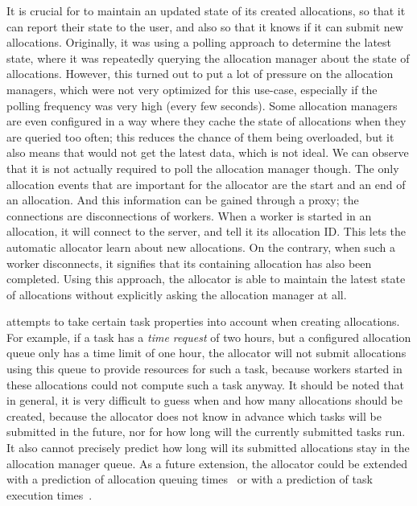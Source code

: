 It is crucial for \autoalloc{} to maintain an updated state of its created allocations, so that it can report their state
to the user, and also so that it knows if it can submit new allocations. Originally, it was using a polling approach to determine
the latest state, where it was repeatedly querying the allocation manager about the state of allocations. However, this
turned out to put a lot of pressure on the allocation managers, which were not very optimized for this use-case, especially
if the polling frequency was very high (every few seconds). Some allocation managers are even configured in a way where
they cache the state of allocations when they are queried too often; this reduces the chance of them being overloaded, but
it also means that \hyperqueue{} would not get the latest data, which is not ideal. We can observe that it is not actually
required to poll the allocation manager though. The only allocation events that are important for the allocator are
the start and an end of an allocation. And this information can be gained through a proxy; the connections are disconnections
of \hq{} workers. When a worker is started in an allocation, it will connect to the server, and tell it its allocation ID.
This lets the automatic allocator learn about new allocations. On the contrary, when such a worker disconnects, it signifies
that its containing allocation has also been completed. Using this approach, the allocator is able to maintain the latest
state of allocations without explicitly asking the allocation manager at all.

\Autoalloc{} attempts to take certain task properties into account when creating allocations. For example, if a task
has a \emph{time request} of two hours, but a configured allocation queue only has a time limit of one hour, the allocator
will not submit allocations using this queue to provide resources for such a task, because workers started in these allocations
could not compute such a task anyway. It should be noted that in general, it is very difficult to guess when and how many
allocations should be created, because the allocator does not know in advance which tasks will be submitted in the future,
nor for how long will the currently submitted tasks run. It also cannot precisely predict how long will its submitted allocations
stay in the allocation manager queue. As a future extension, the allocator could be extended with a prediction of allocation
queuing times~\cite{allocation-duration-prediction} or with a prediction of task execution times~\cite{task-duration-prediction}.

